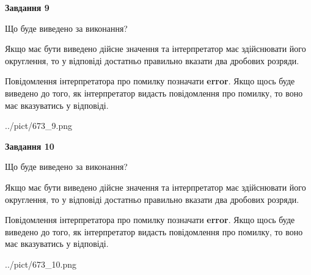 \documentclass[12pt, ukrainian]{article}
\begin{document}
{\begin {Large}
{\begin {center}\textbf{Завдання 9}\end {center}}\par
Що буде виведено за виконання? \par

Якщо має бути виведено дійсне значення та інтерпретатор має здійснювати його округлення, 
то у відповіді достатньо правильно вказати два дробових розряди.

Повідомлення інтерпретатора про помилку позначати \textbf{error}.
Якщо щось буде виведено до того, як інтерпретатор видасть повідомлення про помилку, 
то воно має вказуватись у відповіді. \par

\begin{center}
	{../pict/673_9.png}
\end{center}
\newpage

{\begin {center}\textbf{Завдання 10}\end {center}}\par
Що буде виведено за виконання? \par

Якщо має бути виведено дійсне значення та інтерпретатор має здійснювати його округлення, 
то у відповіді достатньо правильно вказати два дробових розряди.

Повідомлення інтерпретатора про помилку позначати \textbf{error}.
Якщо щось буде виведено до того, як інтерпретатор видасть повідомлення про помилку, 
то воно має вказуватись у відповіді. \par

\begin{center}
	{../pict/673_10.png}
\end{center}
\newpage

\end {Large}}
\end{document}
